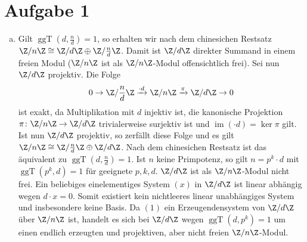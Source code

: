 \documentclass{article}
\newcommand{\im}{\operatorname{im}}
\newcommand{\ggt}{\operatorname{ggT}}
\begin{document}
\section*{Aufgabe 1}
\begin{enumerate}[(a)]
    \item Gilt $\ggt(d, \frac{n}{d}) = 1$, so erhalten wir nach dem chinesichen Restsatz $\Z/n \Z \cong \Z/d\Z \oplus \Z/\frac{n}{d} \Z$.
    Damit ist $\Z/d\Z$ direkter Summand in einem freien Modul ($\Z/n\Z$ ist als $\Z/n\Z$-Modul offensichtlich frei).
    Sei nun $\Z/d\Z$ projektiv.
    Die Folge
    $$0 \to \Z/\frac{n}{d}\Z \xrightarrow{\cdot d} \Z/n\Z \xrightarrow{\pi} \Z/d\Z \to 0$$
    ist exakt, da Multiplikation mit $d$ injektiv ist, die kanonische Projektion $\pi\colon \Z/n\Z \to \Z/d\Z$ trivialerweise 
    surjektiv ist und $\im (\cdot d) = \ker \pi$ gilt.
    Ist nun $\Z/d\Z$ projektiv, so zerfällt diese Folge und es gilt $\Z/n\Z \cong \Z/\frac{n}{d}\Z \oplus \Z/d\Z$.
    Nach dem chinesichen Restsatz ist das äquivalent zu $\ggt(d, \frac{n}{d}) = 1$.
    Ist $n$ keine Primpotenz, so gilt $n = p^k \cdot d$ mit $\ggt(p^k, d) = 1$ für geeignete $p, k, d$.
    $\Z/d\Z$ ist als $\Z/n\Z$-Modul nicht frei. Ein beliebiges einelementiges System $(x)$ in $\Z/d\Z$ ist linear abhängig wegen
    $d\cdot x = 0$. Somit existiert kein nichtleeres linear unabhängiges System und insbesondere keine Basis.
    Da $(1)$ ein Erzeugendensystem von $\Z/d\Z$ über $\Z/n\Z$ ist, handelt es sich bei $\Z/d\Z$ wegen $\ggt(d, p^k) = 1$
    um einen endlich erzeugten und projektiven, aber nicht freien $\Z/n\Z$-Modul.


\end{enumerate}
\end{document}
